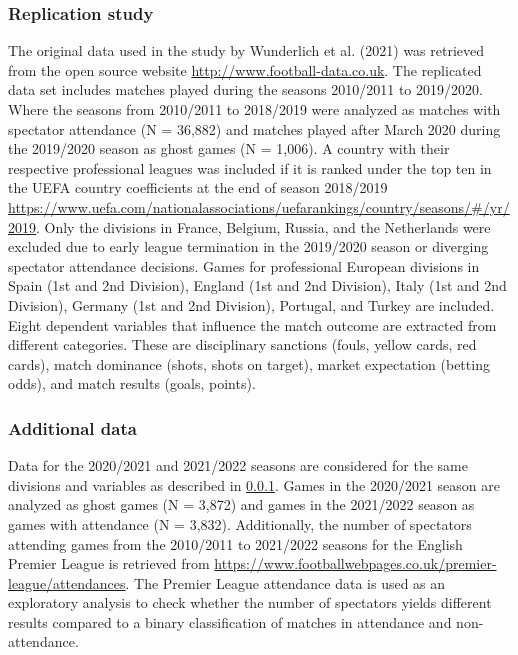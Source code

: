 \subsubsection{Replication study} \label{Replication study}
The original data used in the study by Wunderlich et al. (2021) \cite{wunderlich2021does} was retrieved from the open source website \url{http://www.football-data.co.uk}. The replicated data set includes matches played during the seasons 2010/2011 to 2019/2020. Where the seasons from 2010/2011 to 2018/2019 were analyzed as matches with spectator attendance (N = 36,882) and matches played after March 2020 during the 2019/2020 season as ghost games (N = 1,006). A country with their respective professional leagues was included if it is ranked under the top ten in the UEFA country coefficients at the end of season 2018/2019 \url{https://www.uefa.com/nationalassociations/uefarankings/country/seasons/#/yr/2019}. Only the divisions in France, Belgium, Russia, and the Netherlands were excluded due to early league termination in the 2019/2020 season or diverging spectator attendance decisions. Games for professional European divisions in Spain (1st and 2nd Division), England (1st and 2nd Division), Italy (1st and 2nd Division), Germany (1st and 2nd Division), Portugal, and Turkey are included. Eight dependent variables that influence the match outcome are extracted from different categories. These are disciplinary sanctions (fouls, yellow cards, red cards), match dominance (shots, shots on target), market expectation (betting odds), and match results (goals, points).

\subsubsection{Additional data}
Data for the 2020/2021 and 2021/2022 seasons are considered for the same divisions and variables as described in \ref{Replication study}. Games in the 2020/2021 season are analyzed as ghost games (N = 3,872) and games in the 2021/2022 season as games with attendance (N = 3,832).
Additionally, the number of spectators attending games from the 2010/2011 to 2021/2022 seasons for the English Premier League is retrieved from \url{https://www.footballwebpages.co.uk/premier-league/attendances}. The Premier League attendance data is used as an exploratory analysis to check whether the number of spectators yields different results compared to a binary classification of matches in attendance and non-attendance.

